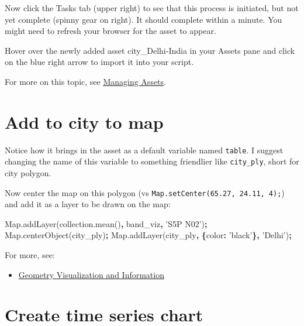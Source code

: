 \documentclass[]{book}
\newenvironment{Shaded}{\begin{snugshade}}{\end{snugshade}}
\newcommand{\AttributeTok}[1]{\textcolor[rgb]{0.77,0.63,0.00}{#1}}
\newcommand{\DataTypeTok}[1]{\textcolor[rgb]{0.13,0.29,0.53}{#1}}
\newcommand{\NormalTok}[1]{#1}
\newcommand{\OperatorTok}[1]{\textcolor[rgb]{0.81,0.36,0.00}{\textbf{#1}}}
\newcommand{\StringTok}[1]{\textcolor[rgb]{0.31,0.60,0.02}{#1}}
\newcommand{\VariableTok}[1]{\textcolor[rgb]{0.00,0.00,0.00}{#1}}
\providecommand{\tightlist}{%
  \setlength{\itemsep}{0pt}\setlength{\parskip}{0pt}}
\begin{document}
Now click the Tasks tab (upper right) to see that this process is initiated, but not yet complete (spinny gear on right). It should complete within a minute. You might need to refresh your browser for the asset to appear.

Hover over the newly added asset city\_Delhi-India in your Assets pane and click on the blue right arrow to import it into your script.

For more on this topic, see \href{https://developers.google.com/earth-engine/asset_manager}{Managing Assets}.

\hypertarget{add-to-city-to-map}{%
\section{Add to city to map}\label{add-to-city-to-map}}

Notice how it brings in the asset as a default variable named \texttt{table}. I suggest changing the name of this variable to something friendlier like \texttt{city\_ply}, short for city polygon.

Now center the map on this polygon (vs \texttt{Map.setCenter(65.27,\ 24.11,\ 4);}) and add it as a layer to be drawn on the map:

\begin{Shaded}
\begin{Highlighting}[]
\VariableTok{Map}\NormalTok{.}\AttributeTok{addLayer}\NormalTok{(}\VariableTok{collection}\NormalTok{.}\AttributeTok{mean}\NormalTok{()}\OperatorTok{,}\NormalTok{ band_viz}\OperatorTok{,} \StringTok{'S5P N02'}\NormalTok{)}\OperatorTok{;}
\VariableTok{Map}\NormalTok{.}\AttributeTok{centerObject}\NormalTok{(city_ply)}\OperatorTok{;}
\VariableTok{Map}\NormalTok{.}\AttributeTok{addLayer}\NormalTok{(city_ply}\OperatorTok{,} \OperatorTok{\{}\DataTypeTok{color}\OperatorTok{:} \StringTok{'black'}\OperatorTok{\},} \StringTok{'Delhi'}\NormalTok{)}\OperatorTok{;}
\end{Highlighting}
\end{Shaded}

For more, see:

\begin{itemize}
\tightlist
\item
  \href{https://developers.google.com/earth-engine/geometry_visualization_info}{Geometry Visualization and Information}
\end{itemize}

\hypertarget{create-time-series-chart}{%
\section{Create time series chart}\label{create-time-series-chart}}
\end{document}
